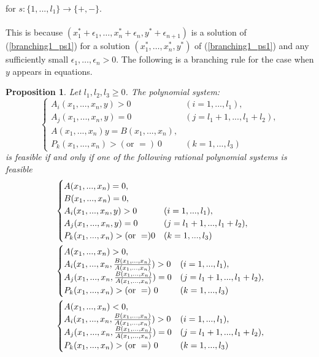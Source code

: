 \documentclass{article}
\newtheorem{prop}[thm]{\bfseries Proposition} %
\begin{document}
for $s:\{ 1,...,l_1\} \rightarrow \{ +,-\}$.
\\
\\
This is because $(x^*_1+\epsilon_1,\dots,x^*_n+\epsilon_n,y^*+\epsilon_{n+1})$ is a solution of
(\ref{branching1_ps1}) for a solution $(x^*_1,\dots,x^*_n,y^*)$ of (\ref{branching1_ps1}) and
any sufficiently small $\epsilon_1,\dots,\epsilon_n > 0$.
The following is a branching rule for the case when $y$ appears in equations.
\begin{prop}\label{branching2}
Let $l_1,l_2,l_3 \geq 0$.
The polynomial system:
\begin{equation} \label{branching2_ps1}
\begin{cases}
A_{i}(x_1,...,x_n,y) > 0 & (i=1,...,l_1), \\ 
A_{j}(x_1,...,x_n,y) = 0 & (j=l_1+1,...,l_1+l_2), \\
A(x_1,...,x_n)y = B(x_1,...,x_n), \\
P_k(x_1,...,x_n) > (\text{or }=)  \ 0 & (k=1,...,l_3)
\end{cases} 
\end{equation}
is feasible if and only if one of the following rational polynomial systems is feasible
\begin{align}\label{branching2_ps2}
& \notag \begin{cases}
A(x_1,...,x_n) = 0, & \\
B(x_1,...,x_n) = 0, & \\
A_{i}(x_{1},...,x_{n},y) > 0  & (i=1,...,l_1),\\
A_{j}(x_1,...,x_n,y) = 0 & (j=l_1+1,...,l_1+l_2),\\
P_k(x_1,...,x_n) > (\text{or }=)  0 & (k=1,...,l_3) 
\end{cases}
\\
&\begin{cases}
A(x_1,...,x_n) > 0, & \\
A_{i}(x_1,...,x_n,\frac{B(x_1,...,x_n)}{A(x_1,...,x_n)}) > 0 & (i=1,...,l_1),\\
A_{j}(x_1,...,x_n,\frac{B(x_1,...,x_n)}{A(x_1,...,x_n)}) = 0 & (j=l_1+1,...,l_1+l_2),\\
P_k(x_1,...,x_n) > (\text{or }=)  \ 0 & (k=1,...,l_3)\\
\end{cases}
\\
& \notag \begin{cases}
A(x_1,...,x_n) < 0, & \\
A_{i}(x_1,...,x_n,\frac{B(x_1,...,x_n)}{A(x_1,...,x_n)}) > 0 & (i=1,...,l_1),\\
A_{j}(x_1,...,x_n,\frac{B(x_1,...,x_n)}{A(x_1,...,x_n)}) = 0 & (j=l_1+1,...,l_1+l_2),\\
P_k(x_1,...,x_n) > (\text{or }=)  \ 0 & (k=1,...,l_3)
\end{cases}
\end{align}
\end{prop}
\end{document}
